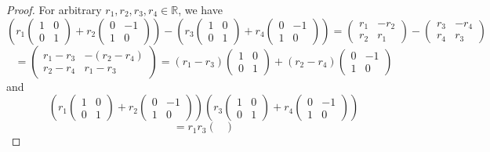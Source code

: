 \documentclass[11pt]{article}
\newcommand{\br}[1]{\left(#1\right)}
\begin{document}
\begin{enumerate}
\begin{proof}
        For arbitrary $r_1,r_2,r_3,r_4\in\mathbb{R}$, we have \[\br{r_1\begin{pmatrix}
            1 & 0 \\ 0 & 1
        \end{pmatrix} + r_2\begin{pmatrix}
            0 & -1 \\ 1 & 0 
        \end{pmatrix}}-\br{r_3\begin{pmatrix}
            1 & 0 \\ 0 & 1
        \end{pmatrix} + r_4\begin{pmatrix}
            0 & -1 \\ 1 & 0 
        \end{pmatrix}} = \begin{pmatrix}
            r_1 & -r_2 \\ r_2 & r_1
        \end{pmatrix} - \begin{pmatrix}
            r_3 & -r_4 \\ r_4 & r_3
        \end{pmatrix}\] \[ = \begin{pmatrix}
            r_1 - r_3 & - (r_2 - r_4) \\ r_2 - r_4 & r_1 - r_3
        \end{pmatrix} = (r_1-r_3)\begin{pmatrix}
            1 & 0 \\ 0 & 1
        \end{pmatrix} + (r_2-r_4)\begin{pmatrix}
            0 & -1 \\ 1 & 0 
        \end{pmatrix}\] and \[\br{r_1\begin{pmatrix}
            1 & 0 \\ 0 & 1
        \end{pmatrix} + r_2\begin{pmatrix}
            0 & -1 \\ 1 & 0 
        \end{pmatrix}}\br{r_3\begin{pmatrix}
            1 & 0 \\ 0 & 1
        \end{pmatrix} + r_4\begin{pmatrix}
            0 & -1 \\ 1 & 0 
        \end{pmatrix}}\] \[ = r_1r_3\begin{pmatrix}

\end{pmatrix}\]
\end{proof}
\end{enumerate}
\end{document}
